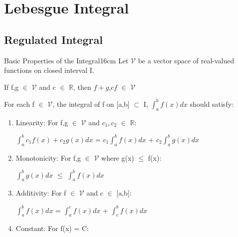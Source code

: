 \newpage

\section[Day 17: Lebesgue Integral]{ Lebesgue Integral }

\subsection{ Regulated Integral }

    \begin{definition}{Basic Properties of the Integral}{16cm}
        Let $\mathcal{V}$ be a vector space of real-valued functions
        on closed interval I.

        \hspace{0.5cm}
        If f,g $\in$ $\mathcal{V}$ and c $\in$ $\mathbb{R}$,
        then $f+g$,$cf$ $\in$ $\mathcal{V}$

        For each f $\in$ $\mathcal{V}$,
        the integral of f on [a,b] $\subset$ I, $\int_a^b f(x) dx$
        should satisfy:

        \begin{enumerate}[label=(\alph*), leftmargin=1cm, itemsep=0.1cm]
            \item {\color{lgreen} Linearity}:
                For f,g $\in$ $\mathcal{V}$ and $c_1,c_2$ $\in$ $\mathbb{R}$:
            
                \hspace{0.5cm}
                $\int_a^b c_1f(x) + c_2g(x) dx$
                = $c_1 \int_a^b f(x) dx$ + $c_2 \int_a^b g(x) dx$

            \item {\color{lgreen} Monotonicity}:
                For f,g $\in$ $\mathcal{V}$ where g(x) $\leq$ f(x):
            
                \hspace{0.5cm}
                $\int_a^b g(x) dx$ $\leq$ $\int_a^b f(x) dx$

            \item {\color{lgreen} Additivity}:
                For f $\in$ $\mathcal{V}$ and c $\in$ [a,b]:
            
                \hspace{0.5cm}
                $\int_a^b f(x) dx$
                = $\int_a^c f(x) dx$ + $\int_c^b f(x) dx$

            \item {\color{lgreen} Constant}:
                For f(x) = C:
            

\end{enumerate}
\end{definition}
